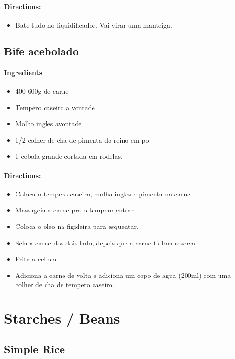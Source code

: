\documentclass{article}
\begin{document}
\paragraph{Directions:}
\begin{itemize}
	\item Bate tudo no liquidificador. Vai virar uma manteiga.
\end{itemize}

\subsection{Bife acebolado}

\paragraph{Ingredients}
\begin{itemize}
	\item 400-600g de carne
	\item Tempero caseiro a vontade
	\item Molho ingles  avontade
	\item 1/2 colher de cha de pimenta do reino em po
	\item 1 cebola grande cortada em rodelas.
\end{itemize}

\paragraph{Directions:}
\begin{itemize}
	\item Coloca o tempero caseiro, molho ingles e pimenta na carne. 
	\item Massageia a carne pra o tempero entrar.
	\item Coloca o oleo na figideira para esquentar.
	\item Sela a carne dos dois lado, depois que a carne ta boa reserva.
	\item Frita a cebola.
	\item Adiciona a carne de volta e adiciona um copo de agua (200ml) com uma colher de cha de tempero caseiro.
\end{itemize}

\section{Starches / Beans}

\subsection{Simple Rice}
\end{document}
